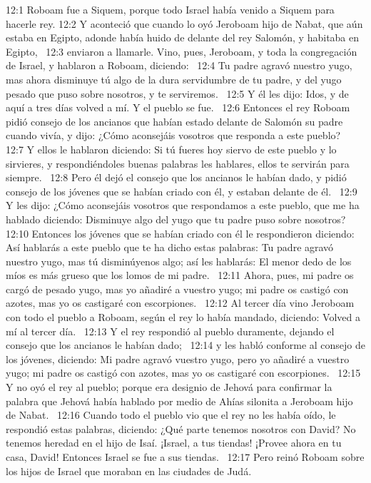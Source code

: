 12:1 Roboam fue a Siquem, porque todo Israel había venido a Siquem para hacerle rey. 
12:2 Y aconteció que cuando lo oyó Jeroboam hijo de Nabat, que aún estaba en Egipto, adonde había huido de delante del rey Salomón, y habitaba en Egipto,  
12:3 enviaron a llamarle. Vino, pues, Jeroboam, y toda la congregación de Israel, y hablaron a Roboam, diciendo:  
12:4 Tu padre agravó nuestro yugo, mas ahora disminuye tú algo de la dura servidumbre de tu padre, y del yugo pesado que puso sobre nosotros, y te serviremos.  
12:5 Y él les dijo: Idos, y de aquí a tres días volved a mí. Y el pueblo se fue.  
12:6 Entonces el rey Roboam pidió consejo de los ancianos que habían estado delante de Salomón su padre cuando vivía, y dijo: ¿Cómo aconsejáis vosotros que responda a este pueblo?  
12:7 Y ellos le hablaron diciendo: Si tú fueres hoy siervo de este pueblo y lo sirvieres, y respondiéndoles buenas palabras les hablares, ellos te servirán para siempre.  
12:8 Pero él dejó el consejo que los ancianos le habían dado, y pidió consejo de los jóvenes que se habían criado con él, y estaban delante de él.  
12:9 Y les dijo: ¿Cómo aconsejáis vosotros que respondamos a este pueblo, que me ha hablado diciendo: Disminuye algo del yugo que tu padre puso sobre nosotros?  
12:10 Entonces los jóvenes que se habían criado con él le respondieron diciendo: Así hablarás a este pueblo que te ha dicho estas palabras: Tu padre agravó nuestro yugo, mas tú disminúyenos algo; así les hablarás: El menor dedo de los míos es más grueso que los lomos de mi padre.  
12:11 Ahora, pues, mi padre os cargó de pesado yugo, mas yo añadiré a vuestro yugo; mi padre os castigó con azotes, mas yo os castigaré con escorpiones.  
12:12 Al tercer día vino Jeroboam con todo el pueblo a Roboam, según el rey lo había mandado, diciendo: Volved a mí al tercer día.  
12:13 Y el rey respondió al pueblo duramente, dejando el consejo que los ancianos le habían dado;  
12:14 y les habló conforme al consejo de los jóvenes, diciendo: Mi padre agravó vuestro yugo, pero yo añadiré a vuestro yugo; mi padre os castigó con azotes, mas yo os castigaré con escorpiones.  
12:15 Y no oyó el rey al pueblo; porque era designio de Jehová para confirmar la palabra que Jehová había hablado por medio de Ahías silonita a Jeroboam hijo de Nabat.  
12:16 Cuando todo el pueblo vio que el rey no les había oído, le respondió estas palabras, diciendo: ¿Qué parte tenemos nosotros con David? No tenemos heredad en el hijo de Isaí. ¡Israel, a tus tiendas! ¡Provee ahora en tu casa, David! Entonces Israel se fue a sus tiendas.  
12:17 Pero reinó Roboam sobre los hijos de Israel que moraban en las ciudades de Judá.  

